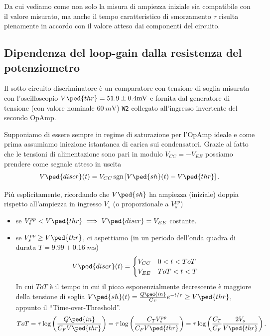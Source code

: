 \documentclass[10pt, a4paper, italian]{article}
\begin{document}
Da cui vediamo come non solo la misura di ampiezza iniziale sia compatibile
con il valore misurato, ma anche il tempo caratteristico di smorzamento $\tau$
risulta pienamente in accordo con il valore atteso dai componenti del
circuito.


\subsection{Dipendenza del loop-gain dalla resistenza del potenziometro}
Il sotto-circuito discriminatore è un comparatore con tensione di soglia
misurata con l'oscilloscopio $V\ped{thr} = 51.9 \pm 0.4 \si{m\V}$ e fornita
dal generatore di tensione (con valore nominale $\SI{60}{m\V}$) \verb+W2+
collegato all'ingresso invertente del secondo OpAmp.

Supponiamo di essere sempre in regime di saturazione per l'OpAmp ideale e
come prima assumiamo iniezione istantanea di carica sui condensatori. 
Grazie al fatto che le tensioni di alimentazione sono pari in modulo
$V_{CC} = - V_{EE}$ possiamo prendere come segnale atteso in uscita
\begin{equation}\label{eq: Vdiscr}
V\ped{discr} (t) = V_{CC} \sgn\left[V\ped{sh}(t) - V\ped{thr}\right].
\end{equation}

Più esplicitamente, ricordando che $V\ped{sh}$ ha ampiezza (iniziale) doppia
rispetto all'ampiezza in ingresso $V_s$ (o proporzionale a $V_s^{pp}$)
\begin{itemize}
\item se $V_s^{pp} < V\ped{thr} \implies V\ped{discr} = V_{EE}$ costante.
\item se $V_s^{pp} \geq V\ped{thr}$, ci aspettiamo (in un periodo dell'onda
quadra di durata $T = 9.99 \pm 0.16 \; \si{m\s}$)
\[
V\ped{discr}(t) =
\begin{cases}
V_{CC} & 0 < t < ToT \\
V_{EE} & ToT < t < T
\end{cases}
\]
In cui $ToT$ è il tempo in cui il picco esponenzialmente decrescente è
maggiore della tensione di soglia
$V\ped{sh}(t) = \frac{Q\ped{in}}{C_F} e^{-t/\tau} \geq V\ped{thr}$, appunto il
``Time-over-Threshold''.
\begin{equation} \label{eq:ToT}
ToT = \tau \log\left(\frac{Q\ped{in}}{C_F V\ped{thr}}\right) =
\tau \log\left(\frac{C_T V_s^{pp}}{C_F V\ped{thr}}\right) = 
\tau \log\left(\frac{C_T}{C_F} \frac{2 V_s}{V\ped{thr}}\right).
\end{equation}
\end{itemize}
\end{document}
